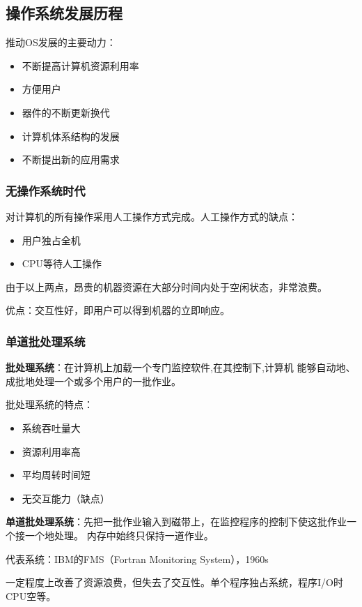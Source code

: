 \documentclass[12pt, a4paper, oneside]{ctexart}
\begin{document}
\subsection{操作系统发展历程}

推动OS发展的主要动力：
\begin{itemize}
  \item 不断提高计算机资源利用率
  \item 方便用户
  \item 器件的不断更新换代
  \item 计算机体系结构的发展
  \item 不断提出新的应用需求
\end{itemize}

\subsubsection{无操作系统时代}

对计算机的所有操作采用人工操作方式完成。人工操作方式的缺点：
\begin{itemize}
  \item 用户独占全机
  \item CPU等待人工操作
\end{itemize}

由于以上两点，昂贵的机器资源在大部分时间内处于空闲状态，非常浪费。

优点：交互性好，即用户可以得到机器的立即响应。

\subsubsection{单道批处理系统}

\textbf{批处理系统}：在计算机上加载一个专门监控软件,在其控制下,计算机
能够自动地、成批地处理一个或多个用户的一批作业。

批处理系统的特点：
\begin{itemize}
  \item 系统吞吐量大
  \item 资源利用率高
  \item 平均周转时间短
  \item 无交互能力（缺点）
\end{itemize}

\textbf{单道批处理系统}：先把一批作业输入到磁带上，在监控程序的控制下使这批作业一个接一个地处理。
内存中始终只保持一道作业。

代表系统：IBM的FMS（Fortran Monitoring System），1960s

一定程度上改善了资源浪费，但失去了交互性。单个程序独占系统，程序I/O时CPU空等。
\end{document}
